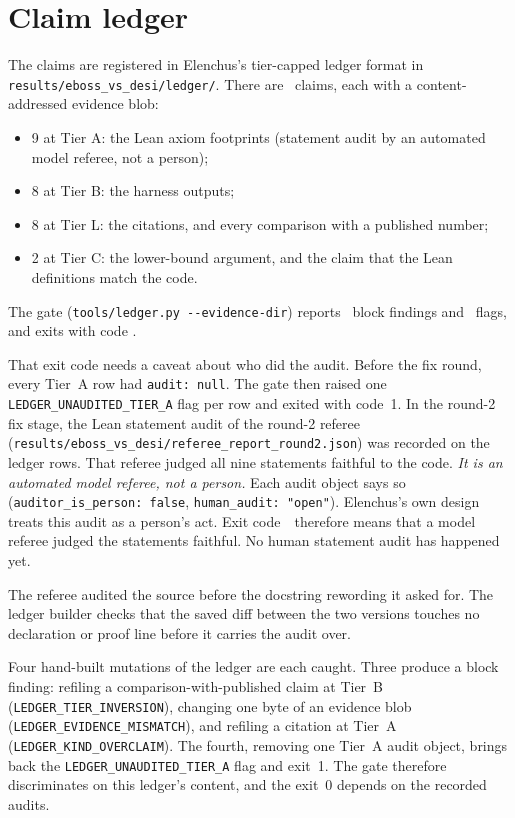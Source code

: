 \documentclass[11pt]{article}
\begin{document}
\section{Claim ledger}\label{sec:ledger}

The claims are registered in Elenchus's tier-capped ledger format in
\texttt{results/eboss\_vs\_desi/ledger/}. There are \LedgerClaims\ claims,
each with a content-addressed evidence blob:
\begin{itemize}
\item 9 at Tier A: the Lean axiom footprints (statement audit by an
  automated model referee, not a person);
\item 8 at Tier B: the harness outputs;
\item 8 at Tier L: the citations, and every comparison with a published
  number;
\item 2 at Tier C: the lower-bound argument, and the claim that the Lean
  definitions match the code.
\end{itemize}

The gate (\texttt{tools/ledger.py -{}-evidence-dir}) reports \LedgerBlock\
block findings and \LedgerFlag\ flags, and exits with code \LedgerRc.

That exit code needs a caveat about who did the audit. Before the fix
round, every Tier~A row had \texttt{audit: null}. The gate then raised one
\texttt{LEDGER\_UNAUDITED\_TIER\_A} flag per row and exited with code~1. In
the round-2 fix stage, the Lean statement audit of the round-2 referee
(\texttt{results/eboss\_vs\_desi/referee\_report\_round2.json}) was
recorded on the ledger rows. That referee judged all nine statements
faithful to the code. \emph{It is an automated model referee, not a person.}
Each audit object says so (\texttt{auditor\_is\_person: false},
\texttt{human\_audit: "open"}). Elenchus's own design treats this audit as a
person's act. Exit code~\LedgerRc\ therefore means that a model referee
judged the statements faithful. No human statement audit has happened yet.

The referee audited the source before the docstring rewording it asked for.
The ledger builder checks that the saved diff between the two versions
touches no declaration or proof line before it carries the audit over.

Four hand-built mutations of the ledger are each caught. Three produce a
block finding: refiling a comparison-with-published claim at Tier~B
(\texttt{LEDGER\_TIER\_INVERSION}), changing one byte of an evidence blob
(\texttt{LEDGER\_EVIDENCE\_MISMATCH}), and refiling a citation at Tier~A
(\texttt{LEDGER\_KIND\_OVERCLAIM}). The fourth, removing one Tier~A audit
object, brings back the \texttt{LEDGER\_UNAUDITED\_TIER\_A} flag and
exit~1. The gate therefore discriminates on this ledger's content, and the
exit~0 depends on the recorded audits.
\end{document}
